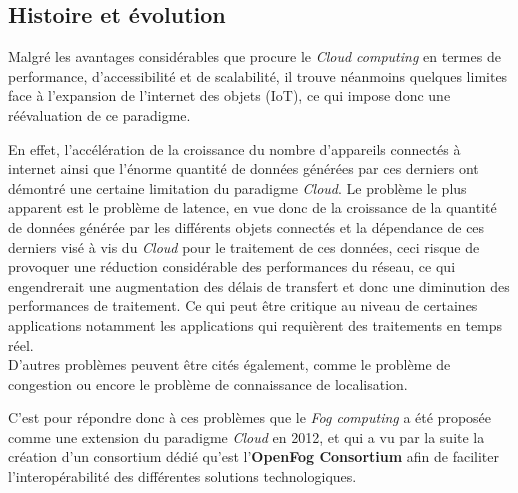 \subsection{Histoire et évolution}
Malgré les avantages considérables que procure le \emph{Cloud computing} en termes de performance, d'accessibilité et de scalabilité, il trouve néanmoins quelques limites face à l'expansion de l'internet des objets (IoT), ce qui impose donc une réévaluation de ce paradigme. \par 
En effet, l'accélération de la croissance du nombre d'appareils connectés à internet ainsi que l'énorme quantité de données générées par ces derniers ont démontré une certaine limitation du paradigme \emph{Cloud}. Le problème le plus apparent est le problème de latence, en vue donc de la croissance de la quantité de données générée par les différents objets connectés et la dépendance de ces derniers visé à vis du \emph{Cloud} pour le traitement de ces données, ceci risque de provoquer une réduction considérable des performances du réseau, ce qui engendrerait une augmentation des délais de transfert et donc une diminution des performances de traitement. Ce qui peut être critique au niveau de certaines applications notamment les applications qui requièrent des traitements en temps réel.\\
D'autres problèmes peuvent être cités également, comme le problème de congestion ou encore le problème de connaissance de localisation. \par
C'est pour répondre donc à ces problèmes que le \emph{Fog computing} a été proposée comme une extension du paradigme \emph{Cloud} en 2012, et qui a vu par la suite la création d'un consortium dédié qu'est l'\textbf{OpenFog Consortium} afin de faciliter l'interopérabilité des différentes solutions technologiques.
